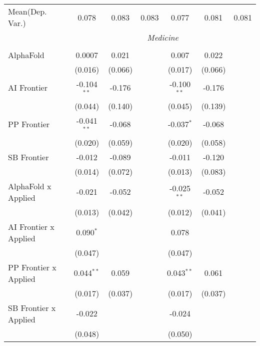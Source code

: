 \begin{tabular}{lcccccc}
Mean(Dep. Var.) & 0.078 & 0.083 & 0.083 & 0.077 & 0.081 & 0.081 \\
 & \multicolumn{6}{c}{\textit{Medicine}} \\ \\
   AlphaFold                    & 0.0007        & 0.021   &             & 0.007         & 0.022   &   \\   
                                & (0.016)       & (0.066) &             & (0.017)       & (0.066) &   \\   
   AI Frontier                  & -0.104$^{**}$ & -0.176  &             & -0.100$^{**}$ & -0.176  &   \\   
                                & (0.044)       & (0.140) &             & (0.045)       & (0.139) &   \\   
   PP Frontier                  & -0.041$^{**}$ & -0.068  &             & -0.037$^{*}$  & -0.068  &   \\   
                                & (0.020)       & (0.059) &             & (0.020)       & (0.058) &   \\   
   SB Frontier                  & -0.012        & -0.089  &             & -0.011        & -0.120  &   \\   
                                & (0.014)       & (0.072) &             & (0.013)       & (0.083) &   \\   
   AlphaFold x Applied          & -0.021        & -0.052  &             & -0.025$^{**}$ & -0.052  &   \\   
                                & (0.013)       & (0.042) &             & (0.012)       & (0.041) &   \\   
   AI Frontier x Applied        & 0.090$^{*}$   &         &             & 0.078         &         &   \\   
                                & (0.047)       &         &             & (0.047)       &         &   \\   
   PP Frontier x Applied        & 0.044$^{**}$  & 0.059   &             & 0.043$^{**}$  & 0.061   &   \\   
                                & (0.017)       & (0.037) &             & (0.017)       & (0.037) &   \\   
   SB Frontier x Applied        & -0.022        &         &             & -0.024        &         &   \\   
                                & (0.048)       &         &             & (0.050)       &         &   \\   

\end{tabular}
